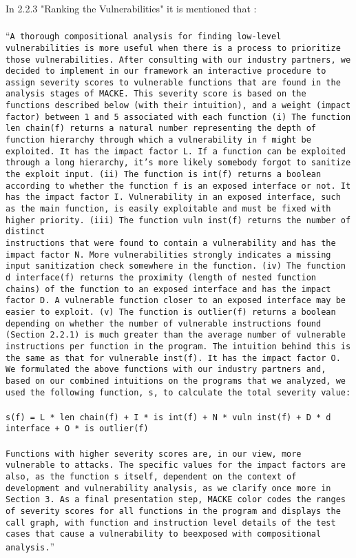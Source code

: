In \parencite{ognawala} 2.2.3 "Ranking the Vulnerabilities" it is mentioned that :
\\\\
\enquote{\texttt{A thorough compositional analysis for finding low-level
vulnerabilities is more useful when there is a process to
prioritize those vulnerabilities. After consulting with our
industry partners, we decided to implement in our framework
an interactive procedure to assign severity scores to
vulnerable functions that are found in the analysis stages
of MACKE. This severity score is based on the functions
described below (with their intuition), and a weight (impact
factor) between 1 and 5 associated with each function (i) The function len chain(f) returns a natural number representing
the depth of function hierarchy through which a
vulnerability in f might be exploited. It has the impact factor
L. If a function can be exploited through a long hierarchy,
it’s more likely somebody forgot to sanitize the exploit input.
(ii) The function is int(f) returns a boolean according to
whether the function f is an exposed interface or not. It has
the impact factor I. Vulnerability in an exposed interface,
such as the main function, is easily exploitable and must
be fixed with higher priority. (iii) The function vuln inst(f)
returns the number of distinct \\ instructions that were found
to contain a vulnerability and has the impact factor N. More
vulnerabilities strongly indicates a missing input sanitization
check somewhere in the function. (iv) The function
d interface(f) returns the proximity (length of nested function
chains) of the function to an exposed interface and has
the impact factor D. A vulnerable function closer to an exposed
interface may be easier to exploit. (v) The function
is outlier(f) returns a boolean depending on whether the
number of vulnerable instructions found (Section 2.2.1) is
much greater than the average number of vulnerable instructions
per function in the program. The intuition behind this
is the same as that for vulnerable inst(f). It has the impact
factor O.
We formulated the above functions with our industry partners
and, based on our combined intuitions on the programs
that we analyzed, we used the following function, s, to calculate
the total severity value:
\\\\
s(f) = L * len chain(f) + I * is int(f) + N * vuln inst(f)
+ D * d interface + O * is outlier(f)
\\\\
Functions with higher severity scores are, in our view, more
vulnerable to attacks. The specific values for the impact
factors are also, as the function s itself, dependent on the
context of development and vulnerability analysis, as we
clarify once more in Section 3.
As a final presentation step, MACKE color codes the
ranges of severity scores for all functions in the program
and displays the call graph, with function and instruction
level details of the test cases that cause a vulnerability to beexposed with compositional \\analysis.}}
\\\\

